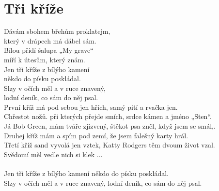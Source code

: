 \section{Tři kříže}
\onehalfspacing

Dávám sbohem břehům proklatejm, \\
který v drápech má ďábel sám.\\
Bílou přídí šalupa „My grave“ \\
míří k útesům, který znám.\\

Jen tři kříže z bílýho kamení \\
někdo do písku poskládal.\\
Slzy v očích měl a v ruce znavený, \\
lodní deník, co sám do něj psal.\\

První kříž má pod sebou jen hřích, samý pití a rvačka jen.\\
Chřestot nožů. při kterých přejde smích, srdce kámen a jméno „Sten“.\\

Já Bob Green, mám tváře zjizvený, štěkot psa zněl, když jsem se smál,.\\
Druhej kříž mám a spím pod zemí, že jsem falešný karty hrál.\\

Třetí kříž sand vyvolá jen vztek, Katty Rodgers těm dvoum život vzal.\\
Svědomí měl vedle nich si klek ...\\

\textit{}\\

Jen tři kříže z bílýho kamení někdo do písku poskládal.\\
Slzy v očích měl a v ruce znavený, lodní deník, co sám do něj psal.\\
